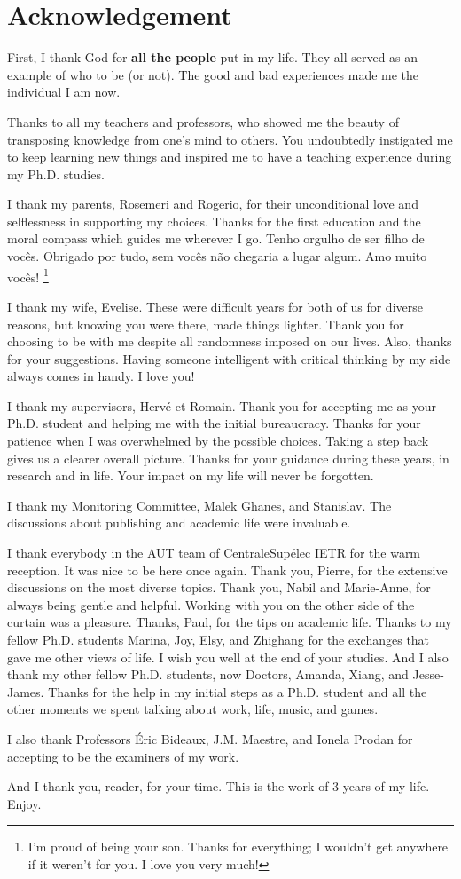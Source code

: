\documentclass[../main.tex]{subfiles}
\begin{document}
\chapter*{Acknowledgement}

First, I thank God for \textbf{all the people} put in my life.
They all served as an example of who to be (or not).
The good and bad experiences made me the individual I am now.

Thanks to all my teachers and professors, who showed me the beauty of transposing knowledge from one's mind to others.
You undoubtedly instigated me to keep learning new things and inspired me to have a teaching experience during my Ph.D. studies.

I thank my parents, Rosemeri and Rogerio, for their unconditional love and selflessness in supporting my choices.
Thanks for the first education and the moral compass which guides me wherever I go. Tenho orgulho de ser filho de vocês. Obrigado por tudo, sem vocês não chegaria a lugar algum. Amo muito vocês! \footnote{I'm proud of being your son. Thanks for everything; I wouldn't get anywhere if it weren't for you. I love you very much!}

I thank my wife, Evelise.
These were difficult years for both of us for diverse reasons, but knowing you were there, made things lighter.
Thank you for choosing to be with me despite all randomness imposed on our lives.
Also, thanks for your suggestions. Having someone intelligent with critical thinking by my side always comes in handy.
I love you!

I thank my supervisors, Hervé et Romain.
Thank you for accepting me as your Ph.D. student and helping me with the initial bureaucracy.
Thanks for your patience when I was overwhelmed by the possible choices.
Taking a step back gives us a clearer overall picture.
Thanks for your guidance during these years, in research and in life.
Your impact on my life will never be forgotten.

I thank my Monitoring Committee, Malek Ghanes, and Stanislav.
The discussions about publishing and academic life were invaluable.

I thank everybody in the AUT team of CentraleSupélec IETR for the warm reception.
It was nice to be here once again.
Thank you, Pierre, for the extensive discussions on the most diverse topics.
Thank you, Nabil and Marie-Anne, for always being gentle and helpful. Working with you on the other side of the curtain was a pleasure.
Thanks, Paul, for the tips on academic life.
Thanks to my fellow Ph.D. students Marina, Joy, Elsy, and Zhighang for the exchanges that gave me other views of life.
I wish you well at the end of your studies.
And I also thank my other fellow Ph.D. students, now Doctors, Amanda, Xiang, and Jesse-James.
Thanks for the help in my initial steps as a Ph.D. student and all the other moments we spent talking about work, life, music, and games.

I also thank Professors Éric Bideaux, J.M. Maestre, and Ionela Prodan for accepting to be the examiners of my work.

And I thank you, reader, for your time. This is the work of 3 years of my life. Enjoy.
\end{document}

